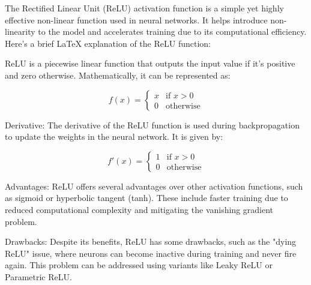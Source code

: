 The Rectified Linear Unit (ReLU) activation function is a simple yet highly effective non-linear function used in neural networks. It helps introduce non-linearity to the model and accelerates training due to its computational efficiency. Here's a brief LaTeX explanation of the ReLU function:

ReLU is a piecewise linear function that outputs the input value if it's positive and zero otherwise. Mathematically, it can be represented as:

\begin{equation}
  f(x) =
  \begin{cases}
    x & \text{if } x > 0 \\
    0 & \text{otherwise}
  \end{cases}
\end{equation}

Derivative: The derivative of the ReLU function is used during backpropagation to update the weights in the neural network. It is given by:

\begin{equation}
  f'(x) =
  \begin{cases}
    1 & \text{if } x > 0 \\
    0 & \text{otherwise}
  \end{cases}
\end{equation}

Advantages: ReLU offers several advantages over other activation functions, such as sigmoid or hyperbolic tangent (tanh). These include faster training due to reduced computational complexity and mitigating the vanishing gradient problem.

Drawbacks: Despite its benefits, ReLU has some drawbacks, such as the "dying ReLU" issue, where neurons can become inactive during training and never fire again. This problem can be addressed using variants like Leaky ReLU or Parametric ReLU.